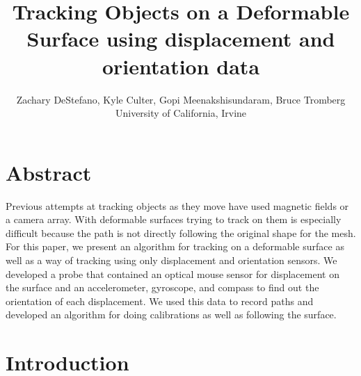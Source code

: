 \documentclass[11pt,psfig]{article}
\begin{document}
\setlength{\parskip}{1.2ex plus0.3ex minus 0.3ex}


\thispagestyle{empty} \pagestyle{myheadings} 



\title{Tracking Objects on a Deformable Surface using displacement and orientation data}
\author{Zachary DeStefano, Kyle Culter, Gopi Meenakshisundaram, Bruce Tromberg\\ University of California, Irvine}

\maketitle

\vfill\eject

\section*{Abstract}

Previous attempts at tracking objects as they move have used magnetic fields or a camera array. With deformable surfaces trying to track on them is especially difficult because the path is not directly following the original shape for the mesh. For this paper, we present an algorithm for tracking on a deformable surface as well as a way of tracking using only displacement and orientation sensors. We developed a probe that contained an optical mouse sensor for displacement on the surface and an accelerometer, gyroscope, and compass to find out the orientation of each displacement. We used this data to record paths and developed an algorithm for doing calibrations as well as following the surface. 

\section*{Introduction}
\end{document}
